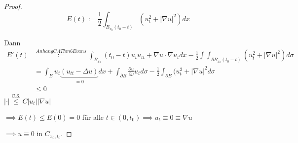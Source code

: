 \begin{proof}
$$
E(t) := \frac{1}{2} \int_{B_{x_0}(t_0 - t)} (u_t^2 + |\nabla u|^2) dx
$$

Dann
\begin{align*}
E'(t) 
&\overset{Anhang C.4 Thm 6 Evans}{:=} \int_{B_{x_0}}(t_0 - t) u_t u_{tt} + \nabla u \cdot \nabla u_t dx - \frac{1}{2} \int \int_{\partial B_{x_0}(t_0 - t)} (u_t^2 + |\nabla u|^2) d\sigma \\
&= \int_B u_t \underbrace{(u_{tt} - \Delta u)}_{=0} dx + \int_{\partial B} \frac{\partial u}{\partial \nu} u_t d\sigma - \frac{1}{2} \int_{\partial B} (u_t^2 + |\nabla u|^2 d\sigma \\
&\leq 0
\end{align*}
{\tiny{$|\cdot| \overset{\text{C.S.}}{\leq} C|u_t| |\nabla u|$}}

$\implies E(t) \leq E(0) = 0$ für alle $t \in (0,t_0) \implies u_t \equiv 0 \equiv \nabla u$

$\implies u \equiv 0$ in $C_{x_0, t_0}$.
\end{proof}

